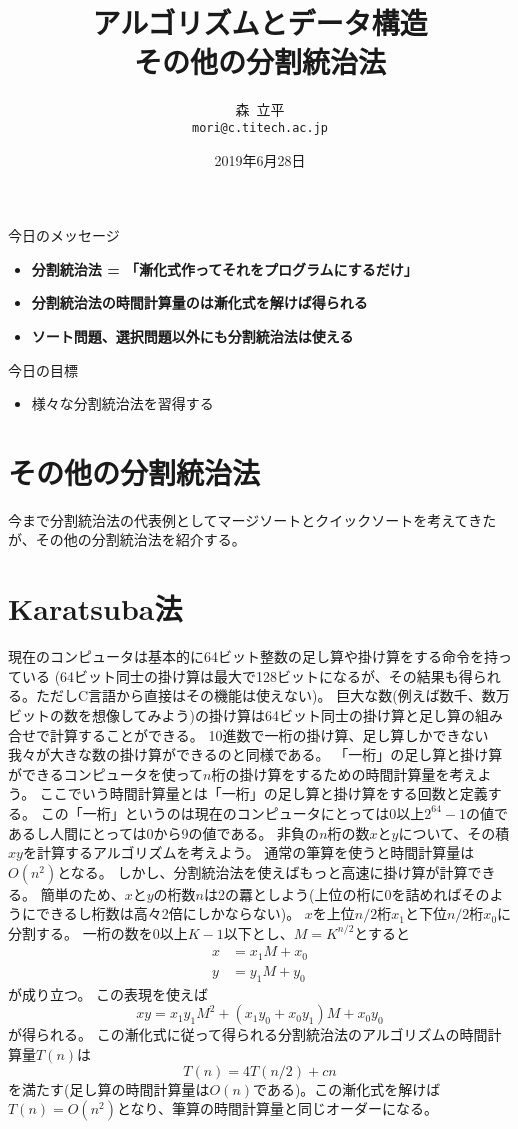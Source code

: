 \documentclass[a4paper,twoside,onecolumn,openany,article,10pt]{memoir}
\title{アルゴリズムとデータ構造\\\vspace{.5em} \Large その他の分割統治法}
\date{2019年6月28日}
\author{森~立平\\ \texttt{mori@c.titech.ac.jp}}
\theoremstyle{definition}
\theoremstyle{remark}
\begin{document}
\maketitle


\noindent
今日のメッセージ
\begin{itemize}
\item \textbf{分割統治法 = 「漸化式作ってそれをプログラムにするだけ」}
\item \textbf{分割統治法の時間計算量のは漸化式を解けば得られる}
\item \textbf{ソート問題、選択問題以外にも分割統治法は使える}
\end{itemize}

\noindent
今日の目標
\begin{itemize}
\item 様々な分割統治法を習得する
\end{itemize}




\section{その他の分割統治法}
今まで分割統治法の代表例としてマージソートとクイックソートを考えてきたが、その他の分割統治法を紹介する。


\section{Karatsuba法}
現在のコンピュータは基本的に64ビット整数の足し算や掛け算をする命令を持っている
(64ビット同士の掛け算は最大で128ビットになるが、その結果も得られる。ただしC言語から直接はその機能は使えない)。
巨大な数(例えば数千、数万ビットの数を想像してみよう)の掛け算は64ビット同士の掛け算と足し算の組み合せで計算することができる。
10進数で一桁の掛け算、足し算しかできない我々が大きな数の掛け算ができるのと同様である。
「一桁」の足し算と掛け算ができるコンピュータを使って$n$桁の掛け算をするための時間計算量を考えよう。
ここでいう時間計算量とは「一桁」の足し算と掛け算をする回数と定義する。
この「一桁」というのは現在のコンピュータにとっては0以上$2^{64}-1$の値であるし人間にとっては0から9の値である。
非負の$n$桁の数$x$と$y$について、その積$xy$を計算するアルゴリズムを考えよう。
通常の筆算を使うと時間計算量は$O(n^2)$となる。
しかし、分割統治法を使えばもっと高速に掛け算が計算できる。
簡単のため、$x$と$y$の桁数$n$は2の羃としよう(上位の桁に0を詰めればそのようにできるし桁数は高々2倍にしかならない)。
$x$を上位$n/2$桁$x_1$と下位$n/2$桁$x_0$に分割する。
一桁の数を0以上$K-1$以下とし、$M=K^{n/2}$とすると
\begin{align*}
x &= x_1 M + x_0\\
y &= y_1 M + y_0
\end{align*}
が成り立つ。
この表現を使えば
\begin{equation*}
xy = x_1y_1 M^2 + (x_1 y_0 + x_0 y_1) M + x_0 y_0
\end{equation*}
が得られる。
この漸化式に従って得られる分割統治法のアルゴリズムの時間計算量$T(n)$は
\begin{equation*}
T(n) = 4T(n/2) + cn
\end{equation*}
を満たす(足し算の時間計算量は$O(n)$である)。この漸化式を解けば$T(n)=O(n^2)$となり、筆算の時間計算量と同じオーダーになる。
\end{document}
